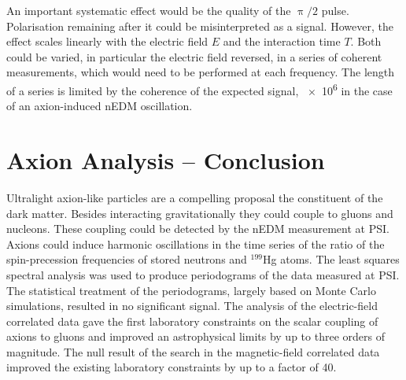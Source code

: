 An important systematic effect would be the quality of the $\uppi/2$ pulse. Polarisation remaining after it could be misinterpreted as a signal. However, the effect scales linearly with the electric field $E$ and the interaction time $T$. Both could be varied, in particular the electric field reversed, in a series of coherent measurements, which would need to be performed at each frequency. The length of a series is limited by the coherence of the expected signal, \num{e6} in the case of an axion-induced nEDM oscillation.




\section*{Axion Analysis -- Conclusion}
Ultralight axion-like particles are a compelling proposal the constituent of the dark matter. Besides interacting gravitationally they could couple to gluons and nucleons. These coupling could be detected by the nEDM measurement at PSI\@. Axions could induce harmonic oscillations in the time series of the ratio of the spin-precession frequencies of stored neutrons and ${}^{199}$Hg atoms. The least squares spectral analysis was used to produce periodograms of the data measured at PSI\@. The statistical treatment of the periodograms, largely based on Monte Carlo simulations, resulted in no significant signal. The analysis of the electric-field correlated data gave the first laboratory constraints on the scalar coupling of axions to gluons and improved an astrophysical limits by up to three orders of magnitude. The null result of the search in the magnetic-field correlated data improved the existing laboratory constraints by up to a factor of 40.